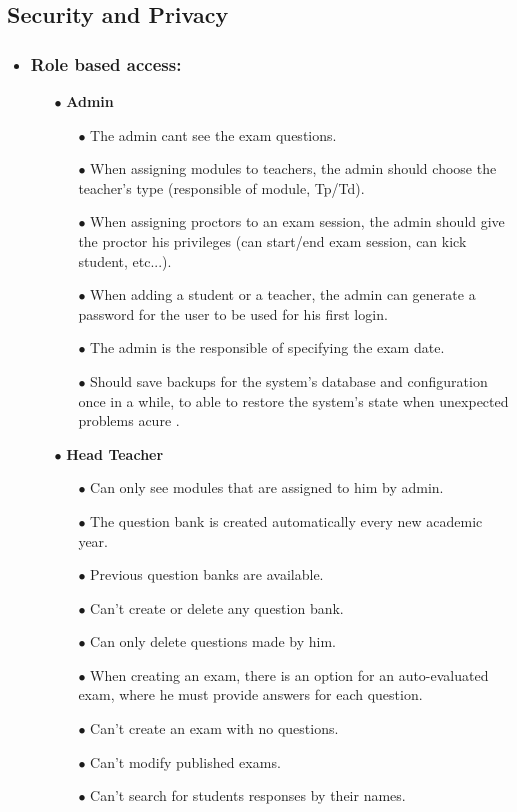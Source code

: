 \documentclass[]{uc2pfecaneva}
\begin{document}
    \raggedright\subsection{Security and Privacy}

    \begin{itemize}
        \item\subsubsection{Role based access:}
        \begin{itemize}
            \item[$\bullet$]\textbf{Admin}
            \begin{itemize}
                \item[$\bullet$] The admin cant see the exam questions.
                \item[$\bullet$] When assigning modules to teachers, the admin should choose the teacher’s type (responsible of module, Tp/Td).
                \item[$\bullet$] When assigning proctors to an exam session, the admin should give the proctor his privileges (can start/end exam session, can kick student, etc...).
                \item[$\bullet$] When adding a student or a teacher, the admin can generate a password for the user to be used for his first login.
                \item[$\bullet$] The admin is the responsible of specifying the exam date.
                \item[$\bullet$] Should save backups for the system’s database and configuration once in a while, to able to restore the system’s state when  unexpected problems acure .
            \end{itemize}

            \item[$\bullet$]\textbf{Head Teacher}
            \begin{itemize}
                \item[$\bullet$] Can only see modules that are assigned to him by admin.
                \item[$\bullet$] The question bank is created automatically every new academic year.
                \item[$\bullet$] Previous question banks are available.
                \item[$\bullet$] Can’t create or delete any question bank.
                \item[$\bullet$] Can only delete questions made by him.
                \item[$\bullet$] When creating an exam, there is an option for an auto-evaluated exam, where he must provide answers for each question.
                \item[$\bullet$] Can’t create an exam with no questions.
                \item[$\bullet$] Can’t modify published exams.
                \item[$\bullet$] Can’t search for students responses by their names.
            \end{itemize}


\end{itemize}
\end{itemize}
\end{document}
